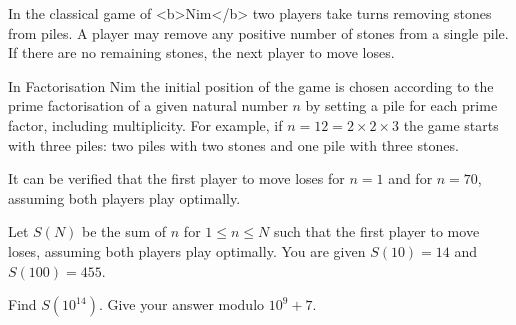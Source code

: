 In the classical game of <b>Nim</b> two players take turns removing stones from piles. A player may remove any positive number of stones from a single pile. If there are no remaining stones, the next player to move loses.

In Factorisation Nim the initial position of the game is chosen according to the prime factorisation of a given natural number $n$ by setting a pile for each prime factor, including multiplicity. For example, if $n=12=2 \times 2 \times 3$ the game starts with three piles: two piles with two stones and one pile with three stones.

It can be verified that the first player to move loses for $n=1$ and for $n=70$, assuming both players play optimally.

Let $S(N)$ be the sum of $n$ for $1 \le n \le N$ such that the first player to move loses, assuming both players play optimally. You are given $S(10) = 14$ and $S(100) = 455$.

Find $S(10^{14})$. Give your answer modulo $10^9 + 7$.

